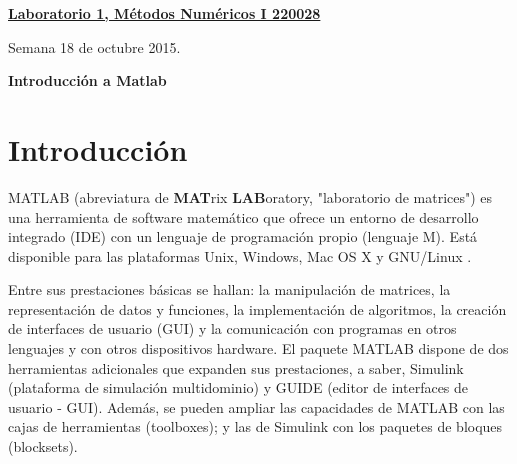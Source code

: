\documentclass[11pt]{article}
\begin{document}
\hspace*{-1,5cm}

\vspace*{0.5cm} \centerline {\bf\underline{Laboratorio 1, M\'etodos Num\'ericos I 220028 }}
\centerline{\textrm{Semana 18 de octubre 2015.}}  \vspace{0.2cm}




\centerline{\textbf{Introducci\'on  a Matlab} \circledR} 
%
\section{Introducci\'on}

MATLAB (abreviatura de \textbf{MAT}rix \textbf{LAB}oratory, "laboratorio de matrices") es una herramienta de 
software matem\'atico que ofrece un entorno de desarrollo integrado (IDE) con un lenguaje de programación propio 
(lenguaje M). Está disponible para las plataformas Unix, Windows, Mac OS X y GNU/Linux .

Entre sus prestaciones básicas se hallan: la manipulación de matrices, la representación de datos y funciones, 
la implementación de algoritmos, la creación de interfaces de usuario (GUI) y la comunicación con programas en 
otros lenguajes y con otros dispositivos hardware. El paquete MATLAB dispone de dos herramientas adicionales 
que expanden sus prestaciones, a saber, Simulink (plataforma de simulación multidominio) y GUIDE 
(editor de interfaces de usuario - GUI). Además, se pueden ampliar las capacidades de MATLAB con las cajas 
de herramientas (toolboxes); y las de Simulink con los paquetes de bloques (blocksets).
%
\end{document}
